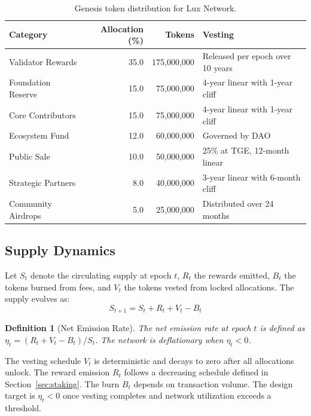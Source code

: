 \documentclass[11pt,a4paper]{article}
\newtheorem{definition}{Definition}
\begin{document}
\begin{table}[H]
\centering
\caption{Genesis token distribution for Lux Network.}
\label{tab:distribution}
\begin{tabular}{lrrp{5cm}}
\toprule
\textbf{Category} & \textbf{Allocation (\%)} & \textbf{Tokens} & \textbf{Vesting} \\
\midrule
Validator Rewards & 35.0 & 175,000,000 & Released per epoch over 10 years \\
Foundation Reserve & 15.0 & 75,000,000 & 4-year linear with 1-year cliff \\
Core Contributors & 15.0 & 75,000,000 & 4-year linear with 1-year cliff \\
Ecosystem Fund & 12.0 & 60,000,000 & Governed by DAO \\
Public Sale & 10.0 & 50,000,000 & 25\% at TGE, 12-month linear \\
Strategic Partners & 8.0 & 40,000,000 & 3-year linear with 6-month cliff \\
Community Airdrops & 5.0 & 25,000,000 & Distributed over 24 months \\
\bottomrule
\end{tabular}
\end{table}

\subsection{Supply Dynamics}

Let $S_t$ denote the circulating supply at epoch $t$, $R_t$ the rewards emitted, $B_t$ the tokens burned from fees, and $V_t$ the tokens vested from locked allocations. The supply evolves as:
\begin{equation}\label{eq:supply}
    S_{t+1} = S_t + R_t + V_t - B_t
\end{equation}

\begin{definition}[Net Emission Rate]
The net emission rate at epoch $t$ is defined as $\eta_t = (R_t + V_t - B_t) / S_t$. The network is deflationary when $\eta_t < 0$.
\end{definition}

The vesting schedule $V_t$ is deterministic and decays to zero after all allocations unlock. The reward emission $R_t$ follows a decreasing schedule defined in Section~\ref{sec:staking}. The burn $B_t$ depends on transaction volume. The design target is $\eta_t < 0$ once vesting completes and network utilization exceeds a threshold.
\end{document}
